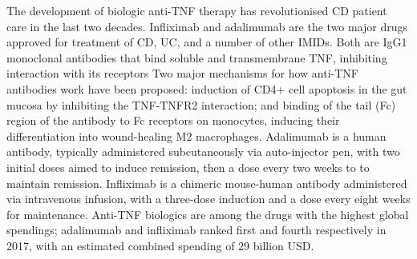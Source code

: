 \begin{outline}
The development of biologic anti-\gls{TNF} therapy has revolutionised \gls{CD} patient care in the last two decades.
Infliximab and adalimumab are the two major drugs approved for treatment of \gls{CD}, \gls{UC}, and a number of other \glspl{IMID}.
Both are IgG1 monoclonal antibodies that bind soluble and transmembrane \gls{TNF}, inhibiting interaction with its receptors\autocite{lichtenstein2013ComprehensiveReviewAntitumor,adegbola2018AntiTNFTherapyCrohn}
Two major mechanisms for how anti-TNF antibodies work have been proposed: induction of CD4+ cell apoptosis in the gut mucosa by inhibiting the \gls{TNF}-TNFR2 interaction; and binding of the tail (Fc) region of the antibody to Fc receptors on monocytes, inducing their differentiation into wound-healing M2 macrophages\autocite{levin2016MechanismActionAntiTNF}.
Adalimumab is a human antibody, typically administered subcutaneously via auto-injector pen, with two initial doses aimed to induce remission, then a dose every two weeks to to maintain remission. 
Infliximab is a chimeric mouse-human antibody administered via intravenous infusion, with a three-dose induction and a dose every eight weeks for maintenance\autocite{adegbola2018AntiTNFTherapyCrohn}.
Anti-\gls{TNF} biologics are among the drugs with the highest global spendings; adalimumab and infliximab ranked first and fourth respectively in 2017,
with an estimated combined spending of 29 billion USD\autocite{aitken2019GlobalUseMedicine}.


\end{outline}
